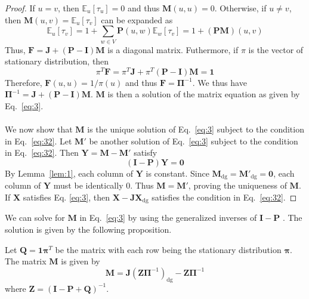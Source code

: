 \begin{proof}
  If $u = v$, then $\mathbb{E}_{u}[\tau_u] = 0$ and thus
  $\mathbf{M}(u,u) = 0$. Otherwise, if $u \not = v$, then
  $\mathbf{M}(u,v) = \mathbb{E}_{u}[\tau_v]$ can be expanded as
  \begin{equation}
    \label{eq:4}
    \mathbb{E}_{u}[\tau_v] = 1 + \sum_{w \in V}{\mathbf{P}(u,w)
      \mathbb{E}_{w}[\tau_v]} = 1 + (\mathbf{PM})(u,v)
  \end{equation}
  Thus, $\mathbf{F} = \mathbf{J} + (\mathbf{P} -
  \mathbf{I})\mathbf{M}$ is a diagonal matrix. Futhermore, if $\pi$ is
  the vector of stationary distribution, then
  \begin{equation}
    \label{eq:26}
    \pi^{T} \mathbf{F} = \pi^{T} \mathbf{J} + \pi^{T} (\mathbf{P} -
    \mathbf{I})\mathbf{M} = \mathbf{1}   
  \end{equation}
  Therefore, $\mathbf{F}(u,u) = 1/\pi(u)$ and thus $\mathbf{F} =
  \bm{\Pi}^{-1}$. We thus have $\bm{\Pi}^{-1} = \mathbf{J} +
  (\mathbf{P} - \mathbf{I})\mathbf{M}$. $\mathbf{M}$ is then a 
  solution of the matrix equation as given by Eq.~\eqref{eq:3}. \\ \\
  \noindent We now show that $\mathbf{M}$ is the unique solution of
  Eq.~\eqref{eq:3} subject to the condition in
  Eq.~\eqref{eq:32}. Let $\mathbf{M}'$ be another solution of
  Eq.~\eqref{eq:3} subject to the condition in
  Eq.~\eqref{eq:32}. Then $\mathbf{Y} = \mathbf{M} - \mathbf{M}'$
  satisfy
  \begin{equation}
    \label{eq:19}
    (\mathbf{I} - \mathbf{P})\mathbf{Y} = \mathbf{0}
  \end{equation}
  By Lemma~\ref{lem:1}, each column of $\mathbf{Y}$ is constant. Since
  $\mathbf{M}_{\mathrm{dg}} = \mathbf{M'}_{\mathrm{dg}} = \mathbf{0}$,
  each column of $\mathbf{Y}$ must be identically $0$. Thus
  $\mathbf{M} = \mathbf{M'}$, proving the uniqueness of
  $\mathbf{M}$. If $\mathbf{X}$ satisfies Eq. \eqref{eq:3}, then
  $\mathbf{X} - \mathbf{J}\mathbf{X}_{\mathrm{dg}}$ satisfies the
  condition in Eq.~\eqref{eq:32}.
\end{proof}
We can solve for $\mathbf{M}$ in Eq.~\eqref{eq:3} by
using the generalized inverses of $\mathbf{I} - \mathbf{P}$
\citep{hunter82:_gener_inver_applic_applied_probab_probl}. The solution
is given by the following proposition. 
%
\begin{proposition}
  \label{prop:5}
  Let $\mathbf{Q} = \mathbf{1}\bm{\pi}^{T}$ be the matrix with
  each row being the stationary distribution $\bm{\pi}$. The matrix
  $\mathbf{M}$ is given by
  \begin{equation}
    \label{eq:21}
    \mathbf{M} = \mathbf{J}(\mathbf{Z} \bm{\Pi}^{-1})_{\mathrm{dg}} - \mathbf{Z}
    \bm{\Pi}^{-1}
  \end{equation}
  where $\mathbf{Z} = (\mathbf{I} - \mathbf{P} + \mathbf{Q})^{-1}$. 
\end{proposition}
